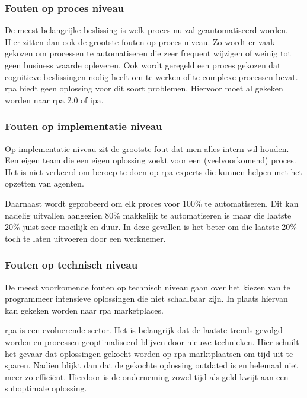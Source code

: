 \subsubsection{Fouten op proces niveau}
De meest belangrijke beslissing is welk proces nu zal geautomatiseerd worden. Hier zitten dan ook de grootste fouten op proces niveau. Zo wordt er vaak gekozen om processen te automatiseren die zeer frequent wijzigen of weinig tot geen business waarde opleveren. Ook wordt geregeld een proces gekozen dat cognitieve beslissingen nodig heeft om te werken of te complexe processen bevat. \acrshort{rpa} biedt geen oplossing voor dit soort problemen. Hiervoor moet al gekeken worden naar \acrshort{rpa} 2.0 of \acrshort{ipa}. \autocite{pitfallsRPA}

\subsubsection{Fouten op implementatie niveau}
Op implementatie niveau zit de grootste fout dat men alles intern wil houden. Een eigen team die een eigen oplossing zoekt voor een (veelvoorkomend) proces. Het is niet verkeerd om beroep te doen op \acrshort{rpa} experts die kunnen helpen met het opzetten van agenten. \autocite{pitfallsRPA}

Daarnaast wordt geprobeerd om elk proces voor 100\% te automatiseren. Dit kan nadelig uitvallen aangezien 80\% makkelijk te automatiseren is maar die laatste 20\% juist zeer moeilijk en duur. In deze gevallen is het beter om die laatste 20\% toch te laten uitvoeren door een werknemer. \autocite{pitfallsRPA}

\subsubsection{Fouten op technisch niveau}
De meest voorkomende fouten op technisch niveau gaan over het kiezen van te programmeer intensieve oplossingen die niet schaalbaar zijn. In plaats hiervan kan gekeken worden naar \acrshort{rpa} marketplaces. \autocite{pitfallsRPA}

\acrshort{rpa} is een evoluerende sector. Het is belangrijk dat de laatste trends gevolgd worden en processen geoptimaliseerd blijven door nieuwe technieken. Hier schuilt het gevaar dat oplossingen gekocht worden op \acrshort{rpa} marktplaatsen om tijd uit te sparen. Nadien blijkt dan dat de gekochte oplossing outdated is en helemaal niet meer zo efficiënt. Hierdoor is de onderneming zowel tijd als geld kwijt aan een suboptimale oplossing. \autocite{pitfallsRPA}

